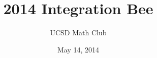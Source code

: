 \documentclass[11pt]{beamer}
\title{2014 Integration Bee}
\author{UCSD Math Club}
\date{May 14, 2014}
\begin{document}
\begin{frame}
  \titlepage
\end{frame}


\end{document}
